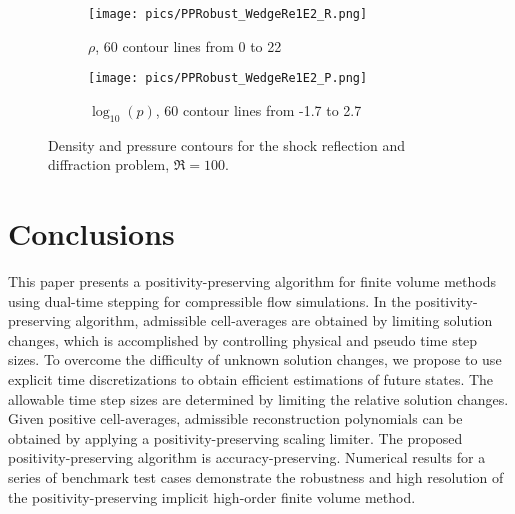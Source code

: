 \begin{figure}[htbp]
    \centering
    \begin{subfigure}{0.5\textwidth}
        \texttt{[image: pics/PPRobust\_WedgeRe1E2\_R.png]}
        \caption[]{$\rho$, 60 contour lines from 0 to 22}
    \end{subfigure}\hfill
    \begin{subfigure}{0.5\textwidth}
        \texttt{[image: pics/PPRobust\_WedgeRe1E2\_P.png]}
        \caption[]{$\log_{10}(p)$, 60 contour lines from -1.7 to 2.7}
    \end{subfigure}
    \caption{Density and pressure contours for the shock reflection and diffraction problem, $\Re=100$.}
    \label{fig:wedgeRe1E2}
\end{figure}


\section{Conclusions}
\label{sec:Conclusions}

This paper presents a positivity-preserving algorithm for finite volume methods using dual-time stepping for compressible flow simulations.
In the positivity-preserving algorithm, admissible cell-averages are obtained by limiting solution changes,
which is accomplished by controlling physical and pseudo time step sizes.
To overcome the difficulty of unknown solution changes,
we propose to use explicit time discretizations to obtain efficient estimations of future states.
The allowable time step sizes are determined by limiting the relative solution changes.
Given positive cell-averages,
admissible reconstruction polynomials can be obtained by applying a positivity-preserving scaling limiter.
The proposed positivity-preserving algorithm is accuracy-preserving.
Numerical results for a series of benchmark test cases demonstrate the robustness and
high resolution of the positivity-preserving implicit high-order finite volume method.

